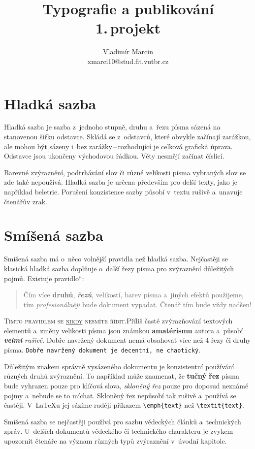 \documentclass[11pt,a4paper,twocolumn]{article}
\newcommand{\myuv}[1]{\quotedblbase #1\textquotedblleft}
\begin{document}
\title{Typografie a publikování\\1.\,projekt}
\author{Vladimír Marcin\\xmarci10@stud.fit.vutbr.cz}
\date{}
\maketitle
\section{Hladká sazba}
Hladká sazba je sazba z~jednoho stupně, druhu a~řezu písma sázená na stanovenou šířku odstavce. Skládá se z~odstavců, které obvykle začínají zarážkou, ale mohou být sázeny i~bez zarážky\,--\,rozhodující je celková grafická úprava. Odstavce jsou ukončeny východovou řádkou. Věty nesmějí začínat číslicí.\par
Barevné zvýraznění, podtrhávání slov či různé velikosti písma vybraných slov se zde také nepoužívá. Hladká sazba je určena především pro delší texty, jako je například beletrie. Porušení konzistence sazby působí v~textu rušivě a~unavuje čtenářův zrak.
\section{Smíšená sazba}
Smíšená sazba má o~něco volnější pravidla než hladká sazba. Nejčastěji se klasická hladká sazba doplňuje o~další řezy písma pro zvýraznění důležitých pojmů. Existuje \myuv{pravidlo}:\par
\begin{quotation}
Čím více \textbf{druhů}, \textbf{\emph{řezů}}, {\scriptsize velikostí}, barev pí\-sma a~jiných efektů použijeme, tím \emph{profe\-sionálněji} bude dokument vypadat. Čtenář tím bude vždy {\Huge nadšen!}
\end{quotation}\par
\textsc{Tímto pravidlem se \underline{nikdy} nesmíte řídit.}\linebreak Příliš časté zvýrazňování textových elementů a~změny velikosti {\tiny písma} jsou {\LARGE známkou} \textbf{{\huge amatéris\-mu}} autora a~působí \textbf{\emph{velmi}} \emph{rušivě}. Dobře navrže\-ný dokument nemá obsahovat více než 4 řezy či druhy písma. \texttt{Dobře navržený dokument je decentní, ne chaotický}.\par
Důležitým znakem správně vysázeného dokumentu je konzistentní používání různých druhů zvýraznění. To například může znamenat, že \textbf{tučný řez} písma bude vyhrazen pouze pro klíčová slova, \emph{skloněný řez} pouze pro doposud neznámé pojmy a~nebude se to míchat. Skloněný řez nepůsobí tak rušivě a~používá se častěji. V~\LaTeX{}u jej sázíme raději příkazem \verb|\emph{text}| než \verb|\textit{text}|.\par
Smíšená sazba se nejčastěji používá pro sazbu vě\-deckých článků a~technických zpráv. U~delších dokumentů vědeckého či technického charakteru je zvykem upozornit čtenáře na význam různých typů zvýraznění v~úvodní kapitole.
\end{document}
